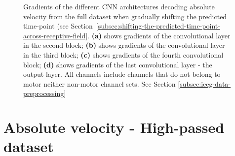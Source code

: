 \begin{figure}[!htpb]
\caption[]{Gradients of the different CNN architectures decoding absolute velocity from the full dataset when gradually shifting the predicted time-point (see Section~\ref{subsec:shifting-the-predicted-time-point-across-receptive-field}. \textbf{(a)} shows gradients of the convolutional layer in the second block; \textbf{(b)} shows gradients of the convolutional layer in the third block; \textbf{(c)} shows gradients of the fourth convolutional block; \textbf{(d)} shows gradients of the last convolutional layer - the output layer. All channels include channels that do not belong to motor neither non-motor channel sets. See Section \ref{subsec:ieeg-data-preprocessing}}
\label{fig:absVel-shifting-grads}
\end{figure}

\clearpage
\section*{Absolute velocity - High-passed dataset}\label{subsec:absVel-high-passed-dataset-appendixC}
